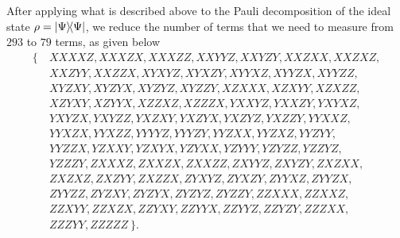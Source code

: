 \noindent
After applying what is described above to the Pauli decomposition of the ideal state $\rho=\ketbra{\Psi}{\Psi}$, we reduce the number of terms that we need to measure from $293$ to $79$ terms, as given below
\begin{align}
\{\> & XXXXZ, XXXZX, XXXZZ, XXYYZ, XXYZY, XXZXX, XXZXZ, \nonumber \\
     & XXZYY, XXZZX, XYXYZ, XYXZY, XYYXZ, XYYZX, XYYZZ, \nonumber \\
	 & XYZXY, XYZYX, XYZYZ, XYZZY, XZXXX, XZXYY, XZXZZ, \nonumber \\
	 & XZYXY, XZYYX, XZZXZ, XZZZX, YXXYZ, YXXZY, YXYXZ, \nonumber \\
	 & YXYZX, YXYZZ, YXZXY, YXZYX, YXZYZ, YXZZY, YYXXZ, \nonumber \\
	 & YYXZX, YYXZZ, YYYYZ, YYYZY, YYZXX, YYZXZ, YYZYY, \nonumber \\
	 & YYZZX, YZXXY, YZXYX, YZYXX, YZYYY, YZYZZ, YZZYZ, \nonumber \\
	 & YZZZY, ZXXXZ, ZXXZX, ZXXZZ, ZXYYZ, ZXYZY, ZXZXX, \nonumber \\
	 & ZXZXZ, ZXZYY, ZXZZX, ZYXYZ, ZYXZY, ZYYXZ, ZYYZX, \nonumber \\ 
	 & ZYYZZ, ZYZXY, ZYZYX, ZYZYZ, ZYZZY, ZZXXX, ZZXXZ, \nonumber \\ 
	 & ZZXYY, ZZXZX, ZZYXY, ZZYYX, ZZYYZ, ZZYZY, ZZZXX, \nonumber \\
	 & ZZZYY, ZZZZZ \>\}.
\end{align}


